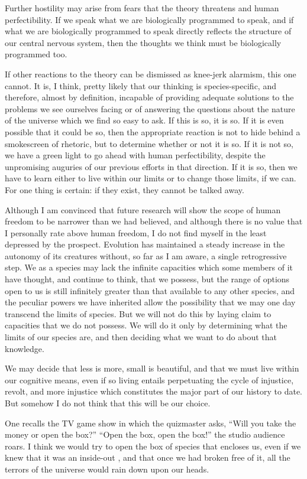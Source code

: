 Further hostility may arise from fears that the theory threatens  and human perfectibility. If we speak what we are biologically programmed to speak, and if what we are biologically programmed to speak directly reflects the structure of our central nervous system, then the thoughts we think must be biologically programmed too.

If other reactions to the theory can be dismissed as knee-jerk alarmism, this one cannot. It is, I think, pretty likely that our thinking is species-specific, and therefore, almost by definition, incapable of providing adequate solutions to the problems we see ourselves facing or of answering the questions about the nature of the universe which we find so easy to ask. If this is so, it is so. If it is even possible that it could be so, then the appropriate reaction is not to hide behind a smokescreen of rhetoric, but to determine whether or not it is so. If it is not so, we have a green light to go ahead with human perfectibility, despite the unpromising auguries of our previous efforts in that direction. If it is so, then we have to learn either to live within our limits or to change those limits, if we can. For one thing is certain: if they exist, they cannot be talked away.

Although I am convinced that future research will show the scope of human freedom to be narrower than we had believed, and although there is no value that I personally rate above human freedom, I do not find myself in the least depressed by the prospect. Evolution has maintained a steady increase in the autonomy of its creatures without, so far as I am aware, a single retrogressive step. We as a species may lack the infinite capacities which some members of it have thought,
and continue to think, that we possess, but the range of options open to us is still infinitely greater than that available to any other species, and the peculiar powers we have inherited allow the possibility that we may one day transcend the limits of species. But we will not do this by laying claim to capacities that we do not possess. We will do it only by determining what the limits of our species are, and then deciding what we want to do about that knowledge.

We may decide that less is more, small is beautiful, and that we must live within our cognitive means, even if so living entails perpetuating the cycle of injustice, revolt, and more injustice which constitutes the major part of our history to date. But somehow I do not think that this will be our choice.
 
One recalls the TV game show in which the quizmaster asks, ``Will you take the money or open the box?'' ``Open the box, open the box!'' the studio audience roars. I think we would try to open the box of species that encloses us, even if we knew that it was an inside-out , and that once we had broken free of it, all the terrors of the universe would rain down upon our heads.